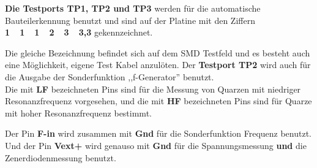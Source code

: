 \textbf {Die Testports TP1, TP2 und TP3} werden für die automatische Bauteilerkennung benutzt
und sind auf der Platine mit den Ziffern \textbf {1~~1~~1~~2~~3~~3,3} gekennzeichnet.

Die gleiche Bezeichnung befindet sich auf dem SMD Testfeld
und es besteht auch eine Möglichkeit, eigene Test Kabel anzulöten.
Der \textbf {Testport TP2} wird auch für die Ausgabe der Sonderfunktion ,,f-Generator'' benutzt.\\
Die mit \textbf {LF} bezeichneten Pins sind für die Messung von Quarzen mit niedriger Resonanzfrequenz vorgesehen,
und die mit \textbf {HF} bezeichneten Pins sind für Quarze mit hoher Resonanzfrequenz bestimmt.

Der Pin \textbf {F-in} wird zusammen mit  \textbf {Gnd} für die Sonderfunktion Frequenz benutzt.
Und der Pin \textbf {Vext+} wird genauso mit \textbf {Gnd} für die Spannungsmessung
\textbf {und} die Zenerdiodenmessung benutzt.

